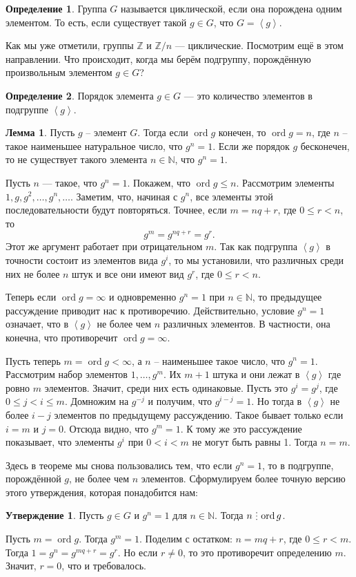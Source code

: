 \documentclass[10pt,a4paper,oneside]{book}
\theoremstyle{definition}
\newtheorem*{defn}{\color{yellow!30!red} Определение}
\newtheorem{lem}{\color{green!50!black}Лемма}
\newtheorem{utvr}{\color{blue!50!black}Утверждение}
\renewcommand{\leq}{\leqslant}
\newcommand{\mb}[1]{\mathbb{#1}}
\newcommand{\ord}{\operatorname{ord}}
\newcommand{\di}{\mathop{\,\scalebox{0.85}{\raisebox{-1.2pt}[0.5\height]{\vdots}}\,}}
\def\lan{\left\langle }
\def\ran{\right\rangle}
\def\dfn{\begin{defn}}
\def\edfn{\end{defn}}
\def\lm{\begin{lem}}
\def\elm{\end{lem}}
\def\utv{\begin{utvr}}
\def\eutv{\end{utvr}}
\begin{document}
\dfn Группа $G$ называется циклической, если она порождена одним элементом. То есть, если существует такой $g\in G$, что $G=\lan g \ran$.
\edfn

Как мы уже отметили, группы $\mb Z$ и $\mb Z/n$ --- циклические. Посмотрим ещё в этом направлении. Что происходит, когда мы берём подгруппу, порождённую произвольным элементом $g \in G$? 


\dfn Порядок элемента $g\in G$ --- это количество элементов в подгруппе $\lan g \ran$.
\edfn

\lm Пусть $g$ -- элемент $G$. Тогда если $\ord g$ конечен, то $\ord g=n$, где $n$ -- такое наименьшее натуральное число, что $g^n=1$. Если же порядок $g$ бесконечен, то не существует такого элемента $n\in \mb N$, что $g^n=1$. 
\elm
\proof Пусть $n$ --- такое, что $g^n=1$. Покажем, что $\ord g \leq n$. Рассмотрим элементы $1,g,g^2,\dots,g^n, \dots$. Заметим, что, начиная с $g^n$, все элементы этой последовательности будут повторяться. Точнее, если $m=nq+r$, где $0\leq r<n$, то
$$g^m=g^{nq+r}=g^r.$$
Этот же аргумент работает при отрицательном $m$. Так как подгруппа $\lan g \ran$ в точности состоит из элементов вида $g^i$, то мы установили, что различных среди них не более $n$ штук и все они имеют вид $g^r$, где $0\leq r < n$. 

Теперь если  $\ord g= \infty$ и одновременно $g^n=1$ при $n \in \mb N$, то предыдущее рассуждение приводит нас к противоречию. Действительно, условие $g^n=1$ означает, что в $\lan g\ran$ не более чем $n$ различных элементов. В частности, она конечна, что противоречит  $\ord g= \infty$.

Пусть теперь  $m=\ord g < \infty$, а $n$ -- наименьшее такое число, что $g^n=1$. Рассмотрим набор элементов $1,\dots,g^m$. Их $m+1$ штука и они лежат в $\lan g \ran$ где ровно $m$ элементов. Значит, среди них есть одинаковые. Пусть это $g^i=g^j$, где $0\leq j <i\leq m$. Домножим на $g^{-j}$ и получим, что $g^{i-j}=1$. Но тогда в $\lan g \ran $ не более $i-j$ элементов по предыдущему рассуждению. Такое бывает только если $i=m$ и $j=0$.  Отсюда видно, что $g^m=1$. К тому же это рассуждение показывает, что элементы $g^i$ при $0<i<m$ не могут быть равны 1. Тогда $n=m$. 

\endproof

Здесь в теореме мы снова пользовались тем, что если $g^n=1$, то в подгруппе, порождённой $g$, не более чем $n$ элементов. Сформулируем более точную версию этого утверждения, которая понадобится нам:

\utv Пусть $g\in  G$ и $g^n=1$ для $n\in \mb N$. Тогда $n \di \ord g$.
\eutv
\proof Пусть $m=\ord g$. Тогда $g^m=1$. Поделим с остатком: $n=mq+r$, где $0\leq r < m$. Тогда $1=g^n=g^{mq+r}=g^r$. Но если $r\neq 0$, то это противоречит определению $m$. Значит, $r=0$, что и требовалось.
\endproof
\end{document}
